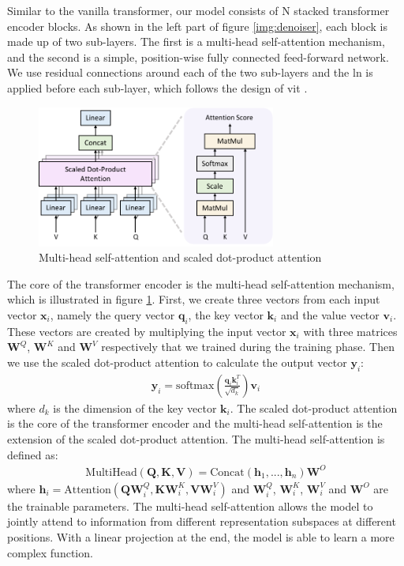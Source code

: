 \documentclass[12pt,DIV14,BCOR12mm,a4paper,footinclude=false,headinclude,parskip=half-,twoside,openright,cleardoublepage=empty,toc=index,bibliography=totoc,listof=totoc]{scrreprt}
\numberwithin{equation}{chapter}
\begin{document}
Similar to the vanilla transformer, our model consists of N stacked transformer encoder blocks. As shown in the left part of figure \ref{img:denoiser}, each block is made up of two sub-layers. The first is a multi-head self-attention mechanism, and the second is a simple, position-wise fully connected feed-forward network. We use residual connections around each of the two sub-layers and the \gls{ln} is applied before each sub-layer, which follows the design of \gls{vit} \cite{dosovitskiy2021image}.
\begin{figure}[h]
	\centering
	\includegraphics[width=0.7\textwidth]{img/mhsa.pdf}
	\caption{Multi-head self-attention and scaled dot-product attention}
	\label{img:mhsa}
\end{figure}

The core of the transformer encoder is the multi-head self-attention mechanism, which is illustrated in figure \ref{img:mhsa}. First, we create three vectors from each input vector $\mathbf{x}_{i}$, namely the query vector $\mathbf{q}_{i}$, the key vector $\mathbf{k}_{i}$ and the value vector $\mathbf{v}_{i}$. These vectors are created by multiplying the input vector $\mathbf{x}_{i}$ with three matrices $\mathbf{W}^{Q}$, $\mathbf{W}^{K}$ and $\mathbf{W}^{V}$ respectively that we trained during the training phase. Then we use the scaled dot-product attention to calculate the output vector $\mathbf{y}_{i}$:
\begin{align}
  \mathbf{y}_{i} = \text{softmax}\left(\frac{\mathbf{q}_{i}\mathbf{k}_{i}^{T}}{\sqrt{d_{k}}}\right)\mathbf{v}_{i}
\end{align}
where $d_{k}$ is the dimension of the key vector $\mathbf{k}_{i}$. The scaled dot-product attention is the core of the transformer encoder and the multi-head self-attention is the extension of the scaled dot-product attention. The multi-head self-attention is defined as:
\begin{align}
  \text{MultiHead}(\mathbf{Q}, \mathbf{K}, \mathbf{V}) = \text{Concat}(\mathbf{h}_{1},...,\mathbf{h}_{n})\mathbf{W}^{O}
\end{align}
where $\mathbf{h}_{i} = \text{Attention}(\mathbf{Q}\mathbf{W}_{i}^{Q}, \mathbf{K}\mathbf{W}_{i}^{K}, \mathbf{V}\mathbf{W}_{i}^{V})$ and $\mathbf{W}_{i}^{Q}$, $\mathbf{W}_{i}^{K}$, $\mathbf{W}_{i}^{V}$ and $\mathbf{W}^{O}$ are the trainable parameters. The multi-head self-attention allows the model to jointly attend to information from different representation subspaces at different positions. With a linear projection at the end, the model is able to learn a more complex function.
\end{document}
